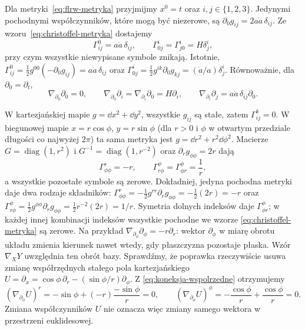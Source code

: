 \begin{przyklad}
\label{prz:flrw-christoffel}
Dla metryki~\eqref{eq:flrw-metryka} przyjmijmy
$x^0=t$ oraz $i,j\in\{1,2,3\}$. Jedynymi pochodnymi
współczynników, które mogą być niezerowe, są
$\partial_0 g_{ij}=2a\dot a\,\delta_{ij}$.
Ze wzoru~\eqref{eq:christoffel-metryka} dostajemy
\begin{equation}\label{eq:flrw-christoffel}
 \Gamma^0_{ij}=a\dot a\,\delta_{ij},\qquad
 \Gamma^i_{0j}=\Gamma^i_{j0}=H\delta^i_j,
\end{equation}
przy czym wszystkie niewypisane symbole znikają.
Istotnie,
$\Gamma^0_{ij}=\tfrac12g^{00}(-\partial_0g_{ij})
=a\dot a\,\delta_{ij}$ oraz
$\Gamma^i_{0j}=\tfrac12g^{ik}\partial_0g_{kj}
=(\dot a/a)\delta^i_j$.
Równoważnie, dla $\partial_0=\partial_t$,
\[
 \nabla_{\partial_0}\partial_0=0,\qquad
 \nabla_{\partial_0}\partial_i
 =\nabla_{\partial_i}\partial_0=H\partial_i,\qquad
 \nabla_{\partial_i}\partial_j=a\dot a\,\delta_{ij}\partial_0.
\]
\end{przyklad}

\begin{przyklad}
\label{prz:christoffel-biegunowe}
W kartezjańskiej mapie $g=\dd x^2+\dd y^2$,
wszystkie $g_{ij}$ są stałe, zatem $\Gamma^k_{ij}=0$.
W biegunowej mapie $x=r\cos\phi$, $y=r\sin\phi$
(dla $r>0$ i $\phi$ w otwartym przedziale długości co najwyżej
$2\pi$) ta sama metryka jest
$g=\dd r^2+r^2\dd\phi^2$.
Macierze $G=\operatorname{diag}(1,r^2)$
i $G^{-1}=\operatorname{diag}(1,r^{-2})$ oraz
$\partial_r g_{\phi\phi}=2r$ dają
\begin{equation}\label{eq:gamma-biegunowe}
 \Gamma^r_{\phi\phi}=-r,
 \qquad \Gamma^\phi_{r\phi}
 =\Gamma^\phi_{\phi r}=\frac1r,
\end{equation}
a wszystkie pozostałe symbole są zerowe.
Dokładniej, jedyna pochodna metryki daje dwa rodzaje składników:
$\Gamma^r_{\phi\phi}
=-\tfrac12g^{rr}\partial_rg_{\phi\phi}
=-\tfrac12(2r)=-r$ oraz
$\Gamma^\phi_{r\phi}
=\tfrac12g^{\phi\phi}\partial_rg_{\phi\phi}
=\tfrac12r^{-2}(2r)=1/r$.
Symetria dolnych indeksów daje $\Gamma^\phi_{\phi r}$;
w każdej innej kombinacji indeksów wszystkie pochodne
we wzorze \eqref{eq:christoffel-metryka} są zerowe.
Na przykład
$\nabla_{\partial_\phi}\partial_\phi=-r\partial_r$:
wektor $\partial_\phi$ w miarę obrotu układu
zmienia kierunek nawet wtedy, gdy płaszczyzna
pozostaje płaska. Wzór $\nabla_XY$ uwzględnia
ten obrót bazy.
Sprawdźmy, że poprawka rzeczywiście usuwa zmianę
współrzędnych stałego pola kartezjańskiego
$U=\partial_x=\cos\phi\,\partial_r-(\sin\phi/r)\partial_\phi$.
Z \eqref{eq:koneksja-wspolrzedne} otrzymujemy
\[
 (\nabla_{\partial_\phi}U)^r
 =-\sin\phi+(-r)\frac{-\sin\phi}{r}=0,
 \qquad
 (\nabla_{\partial_\phi}U)^\phi
 =-\frac{\cos\phi}{r}+\frac{\cos\phi}{r}=0.
\]
Zmiana współczynników $U$ nie oznacza więc zmiany
samego wektora w przestrzeni euklidesowej.
\end{przyklad}

